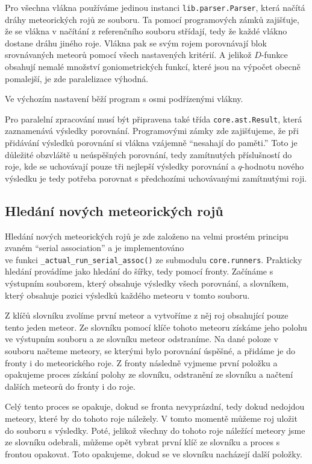Pro všechna vlákna používáme jedinou instanci \texttt{lib.parser.Parser}, která načítá dráhy meteorických rojů ze souboru. Ta pomocí programových zámků zajišťuje, že se vlákna v načítání z referenčního souboru střídají, tedy že každé vlákno dostane dráhu jiného roje. Vlákna pak se svým rojem porovnávají blok srovnávaných meteorů pomocí všech nastavených kritérií. A jelikož $D$-funkce obsahují nemalé množství goniometrických funkcí, které jsou na výpočet obecně pomalejší, je zde paralelizace výhodná.

Ve výchozím nastavení běží program s osmi podřízenými vlákny.

\medskip

Pro paralelní zpracování musí být připravena také třída \texttt{core.ast.Result}, která zaznamenává výsledky porovnání. Programovými zámky zde zajišťujeme, že při přidávání výsledků porovnání si vlákna vzájemně "`nesahají do paměti."' Toto je důležité obzvláště u neúspěšných porovnání, tedy zamítnutých příslušností do roje, kde se uchovávají pouze tři nejlepší výsledky porovnání a $q$-hodnotu nového výsledku je tedy potřeba porovnat s předchozími uchovávanými zamítnutými roji.

\subsection{Hledání nových meteorických rojů\label{sec:practical:association}}%
Hledání nových meteorických rojů je zde založeno na velmi prostém principu zvaném "`serial association"' a je implementováno \\ve funkci \texttt{\_actual\_run\_serial\_assoc()} ze submodulu \texttt{core.runners}. Prakticky hledání provádíme jako hledání do šířky, tedy pomocí fronty. Začínáme s výstupním souborem, který obsahuje výsledky všech porovnání, a slovníkem, který obsahuje pozici výsledků každého meteoru v tomto souboru.

Z klíčů slovníku zvolíme první meteor a vytvoříme z něj roj obsahující pouze tento jeden meteor. Ze slovníku pomocí klíče tohoto meteoru získáme jeho polohu ve výstupním souboru a ze slovníku meteor odstraníme. Na dané poloze v souboru načteme meteory, se kterými bylo porovnání úspěšné, a přidáme je do fronty i do meteorického roje. Z fronty následně vyjmeme první položku a opakujeme proces získání polohy ze slovníku, odstranění ze slovníku a načtení dalších meteorů do fronty i do roje.

Celý tento proces se opakuje, dokud se fronta nevyprázdní, tedy dokud nedojdou meteory, které by do tohoto roje náležely. V tomto momentě můžeme roj uložit do souboru s výsledky. Poté, jelikož všechny do tohoto roje náležící meteory jsme ze slovníku odebrali, můžeme opět vybrat první klíč ze slovníku a proces s frontou opakovat. Toto opakujeme, dokud se ve slovníku nacházejí další položky.


